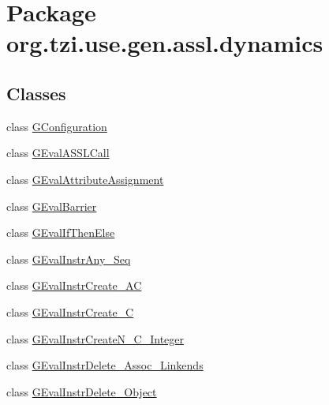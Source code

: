 \hypertarget{namespaceorg_1_1tzi_1_1use_1_1gen_1_1assl_1_1dynamics}{\section{Package org.\-tzi.\-use.\-gen.\-assl.\-dynamics}
\label{namespaceorg_1_1tzi_1_1use_1_1gen_1_1assl_1_1dynamics}
}
\subsection*{Classes}
\begin{DoxyCompactItemize}
\item 
class \hyperlink{classorg_1_1tzi_1_1use_1_1gen_1_1assl_1_1dynamics_1_1_g_configuration}{G\-Configuration}
\item 
class \hyperlink{classorg_1_1tzi_1_1use_1_1gen_1_1assl_1_1dynamics_1_1_g_eval_a_s_s_l_call}{G\-Eval\-A\-S\-S\-L\-Call}
\item 
class \hyperlink{classorg_1_1tzi_1_1use_1_1gen_1_1assl_1_1dynamics_1_1_g_eval_attribute_assignment}{G\-Eval\-Attribute\-Assignment}
\item 
class \hyperlink{classorg_1_1tzi_1_1use_1_1gen_1_1assl_1_1dynamics_1_1_g_eval_barrier}{G\-Eval\-Barrier}
\item 
class \hyperlink{classorg_1_1tzi_1_1use_1_1gen_1_1assl_1_1dynamics_1_1_g_eval_if_then_else}{G\-Eval\-If\-Then\-Else}
\item 
class \hyperlink{classorg_1_1tzi_1_1use_1_1gen_1_1assl_1_1dynamics_1_1_g_eval_instr_any___seq}{G\-Eval\-Instr\-Any\-\_\-\-Seq}
\item 
class \hyperlink{classorg_1_1tzi_1_1use_1_1gen_1_1assl_1_1dynamics_1_1_g_eval_instr_create___a_c}{G\-Eval\-Instr\-Create\-\_\-\-A\-C}
\item 
class \hyperlink{classorg_1_1tzi_1_1use_1_1gen_1_1assl_1_1dynamics_1_1_g_eval_instr_create___c}{G\-Eval\-Instr\-Create\-\_\-\-C}
\item 
class \hyperlink{classorg_1_1tzi_1_1use_1_1gen_1_1assl_1_1dynamics_1_1_g_eval_instr_create_n___c___integer}{G\-Eval\-Instr\-Create\-N\-\_\-\-C\-\_\-\-Integer}
\item 
class \hyperlink{classorg_1_1tzi_1_1use_1_1gen_1_1assl_1_1dynamics_1_1_g_eval_instr_delete___assoc___linkends}{G\-Eval\-Instr\-Delete\-\_\-\-Assoc\-\_\-\-Linkends}
\item 
class \hyperlink{classorg_1_1tzi_1_1use_1_1gen_1_1assl_1_1dynamics_1_1_g_eval_instr_delete___object}{G\-Eval\-Instr\-Delete\-\_\-\-Object}

\end{DoxyCompactItemize}
